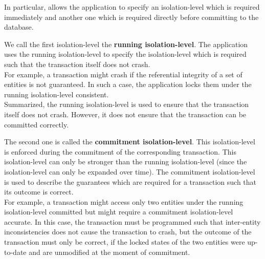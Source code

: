 \documentclass[a4paper, 10pt]{book}
\begin{document}
                                In particular, \SYNEIGHT allows the application to specify an
                                isolation-level which is required immediately and another one which is
                                required directly before committing to the database. 
                                \begin{description}
                                    \item We call the first isolation-level the \textbf{running
                                        isolation-level}. The application uses the running isolation-level
                                        to specify the isolation-level which is required such that the
                                        transaction itself does not crash.\\
                                        For example, a transaction might
                                        crash if the referential integrity of a set of entities is not
                                        guaranteed. In such a case, the application locks them under the
                                        running isolation-level consistent.\\
                                        Summarized, the running isolation-level is used to ensure that the
                                        transaction itself does not crash. However, it does not ensure that
                                        the transaction can be committed correctly. 
                                    \item The second one is called the \textbf{commitment isolation-level}.
                                        This isolation-level is enforced during the commitment of the
                                        corresponding transaction. This isolation-level can only be stronger
                                        than the running isolation-level (since the isolation-level can only
                                        be expanded over time). 
                                        The commitment isolation-level is used to describe the guarantees
                                        which are required for a transaction such that its outcome is
                                        correct.\\
                                        For example, a transaction might access only two entities under the
                                        running isolation-level committed but might require a commitment
                                        isolation-level accurate. In this case, the transaction must
                                        be programmed such that inter-entity inconsistencies does not cause
                                        the transaction to crash, but the outcome of the transaction must
                                        only be correct, if the locked states of the two entities were
                                        up-to-date and are unmodified at the moment of commitment.
                                \end{description}
\end{document}
